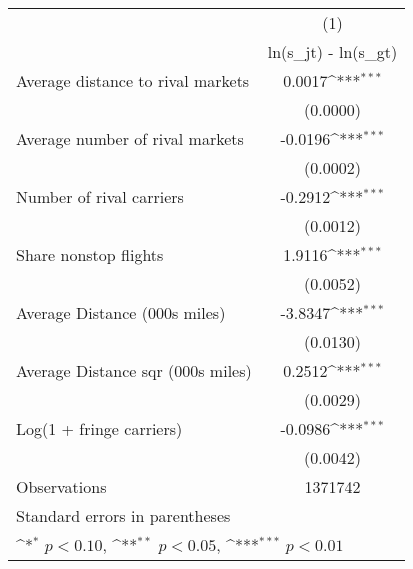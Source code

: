 {
\def\sym#1{\ifmmode^{#1}\else\(^{#1}\)\fi}
\begin{tabular}{l*{1}{c}}
\toprule
                    &\multicolumn{1}{c}{(1)}\\
                    &\multicolumn{1}{c}{ln(s\_jt) - ln(s\_gt)}\\
\midrule
Average distance to rival markets&      0.0017\sym{***}\\
                    &    (0.0000)         \\
\addlinespace
Average number of rival markets&     -0.0196\sym{***}\\
                    &    (0.0002)         \\
\addlinespace
Number of rival carriers&     -0.2912\sym{***}\\
                    &    (0.0012)         \\
\addlinespace
Share nonstop flights &      1.9116\sym{***}\\
                    &    (0.0052)         \\
\addlinespace
Average Distance (000s miles)&     -3.8347\sym{***}\\
                    &    (0.0130)         \\
\addlinespace
Average Distance sqr (000s miles)&      0.2512\sym{***}\\
                    &    (0.0029)         \\
\addlinespace
Log(1 + fringe carriers)&     -0.0986\sym{***}\\
                    &    (0.0042)         \\
\midrule
Observations        &     1371742         \\
\bottomrule
\multicolumn{2}{l}{\footnotesize Standard errors in parentheses}\\
\multicolumn{2}{l}{\footnotesize \sym{*} \(p<0.10\), \sym{**} \(p<0.05\), \sym{***} \(p<0.01\)}\\
\end{tabular}
}
